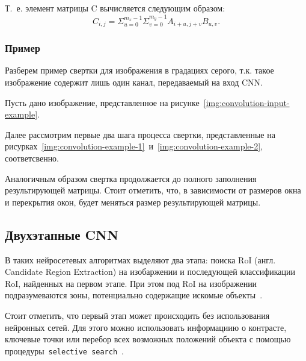Т.~е. элемент матрицы C вычисляется следующим образом:
\begin{equation}
C_{i,j} = \Sigma_{u=0}^{m_x-1} \Sigma_{v=0}^{m_y-1} A_{i+u,j+v}B_{u,v}.
\end{equation}

\subsubsection*{Пример}

Разберем пример свертки для изображения в градациях серого, т.к. такое изображение содержит лишь один канал, передаваемый на вход CNN.

Пусть дано изображение, представленное на рисунке~\ref{img:convolution-input-example}.


Далее рассмотрим первые два шага процесса свертки, представленные на рисурках~\ref{img:convolution-example-1}~и~\ref{img:convolution-example-2}, соответсвенно.



Аналогичным образом свертка продолжается до полного заполнения результирующей матрицы. Стоит отметить, что, в зависимости от размеров окна и перекрытия окон, будет меняться размер результирующей матрицы.

\subsection{Двухэтапные CNN}

В таких нейросетевых алгоритмах выделяют два этапа: поиска RoI (англ. Candidate Region Extraction) на изобаржении и последующей классификации RoI, найденных на первом этапе. При этом под RoI на изображении подразумеваются зоны, потенциально содержащие искомые объекты~\cite{overview-of-two-stage-object-detection}. 


Стоит отметить, что первый этап может происходить без использования нейронных сетей. Для этого можно использовать информациию о контрасте, ключевые точки или перебор всех возможных положений объекта с помощью процедуры~\texttt{selective search}~\cite{realtime-recognition-algorythm}.

